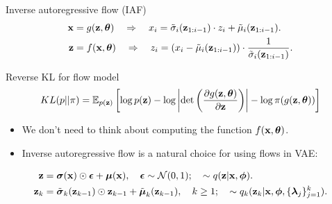 \begin{frame}{Inverse autoregressive flow (IAF)}
	\vspace{-0.3cm}
	\begin{align*}
		\mathbf{x} &= g(\mathbf{z}, \boldsymbol{\theta}) \quad \Rightarrow \quad x_i = \tilde{\sigma}_i (\mathbf{z}_{1:i-1}) \cdot z_i + \tilde{\mu}_i(\mathbf{z}_{1:i-1}). \\
		\mathbf{z} &= f(\mathbf{x}, \boldsymbol{\theta}) \quad \Rightarrow \quad z_i = \left(x_i - \tilde{\mu}_i(\mathbf{z}_{1:i-1}) \right) \cdot \frac{1}{\tilde{\sigma}_i (\mathbf{z}_{1:i-1})}.
	\end{align*}
	\vspace{-0.5cm}
	\begin{block}{Reverse KL for flow model}
  		\vspace{-0.5cm}
		\[
			KL(p || \pi)  = \mathbb{E}_{p(\mathbf{z})} \left[  \log p(\mathbf{z}) - \log \left|\det \left( \frac{\partial g(\mathbf{z}, \boldsymbol{\theta})}{\partial \mathbf{z}} \right) \right| - \log \pi(g(\mathbf{z}, \boldsymbol{\theta})) \right]
		\]
		\vspace{-0.3cm}
	\end{block}
	\begin{itemize}
	\item We don’t need to think about computing the function $f(\mathbf{x}, \boldsymbol{\theta})$.
	\item Inverse autoregressive flow is a natural choice for using flows in VAE:
	\end{itemize}
	\vspace{-0.3cm}
	\begin{align*}
		\mathbf{z} &= \boldsymbol{\sigma}(\mathbf{x}) \odot \boldsymbol{\epsilon} + \boldsymbol{\mu}(\mathbf{x}), \quad \boldsymbol{\epsilon} \sim \mathcal{N}(0, 1); \quad  \sim q(\mathbf{z} | \mathbf{x}, \boldsymbol{\phi}). \\
		\mathbf{z}_k &= \tilde{\boldsymbol{\sigma}}_k(\mathbf{z}_{k - 1}) \odot \mathbf{z}_{k-1} + \tilde{\boldsymbol{\mu}}_k(\mathbf{z}_{k - 1}), \quad k \geq 1; \quad  \sim q_k(\mathbf{z}_k | \mathbf{x}, \boldsymbol{\phi}, \{\boldsymbol{\lambda}_j\}_{j=1}^k).
	\end{align*}
\end{frame}
